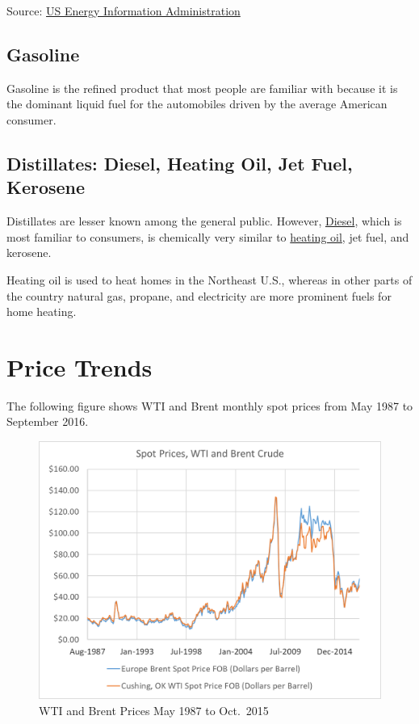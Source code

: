 \documentclass[
  letterpaper,
  DIV=11,
  numbers=noendperiod]{scrreprt}
\begin{document}
Source:
\href{http://www.eia.gov/Energyexplained/index.cfm?page=oil_home}{US
Energy Information Administration}

\hypertarget{gasoline}{%
\subsection{Gasoline}\label{gasoline}}

Gasoline is the refined product that most people are familiar with
because it is the dominant liquid fuel for the automobiles driven by the
average American consumer.

\hypertarget{distillates-diesel-heating-oil-jet-fuel-kerosene}{%
\subsection{Distillates: Diesel, Heating Oil, Jet Fuel,
Kerosene}\label{distillates-diesel-heating-oil-jet-fuel-kerosene}}

Distillates are lesser known among the general public. However,
\href{http://www.eia.gov/Energyexplained/index.cfm?page=diesel_home}{Diesel},
which is most familiar to consumers, is chemically very similar to
\href{http://www.eia.gov/Energyexplained/index.cfm?page=heating_oil_use}{heating
oil}, jet fuel, and kerosene.

Heating oil is used to heat homes in the Northeast U.S., whereas in
other parts of the country natural gas, propane, and electricity are
more prominent fuels for home heating.

\hypertarget{price-trends}{%
\section{Price Trends}\label{price-trends}}

The following figure shows WTI and Brent monthly spot prices from May
1987 to September 2016.

\begin{figure}

{\centering \includegraphics{Excel-files/CrudeOiland-crudeoil_files/image003.png}

}

\caption{WTI and Brent Prices May 1987 to Oct.~2015}

\end{figure}
\end{document}
